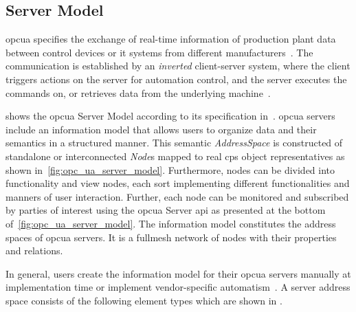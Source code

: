 \documentclass[
a4paper,
twoside,
headsepline,
cleardoublepage=empty,
parskip=half,
draft=false
]{scrbook}
\begin{document}
			\subsection{Server Model}\label{subsec:opc_ua_server_model}

				\gls{opcua} specifies the exchange of real-time information of production plant data between control devices or \gls{it} systems from different manufacturers~\cite{venkatesh2005validating}.
				The communication is established by an \textit{inverted} client-server system, where the client triggers actions on the server for automation control, and the server executes the commands on, or retrieves data from the underlying machine~\cite{imtiaz2013scalability}.
				
				 shows the \gls{opcua} Server Model according to its specification in~\cite{opcfoundation2017part1}.
				\gls{opcua} servers include an information model that allows users to organize data and their semantics in a structured manner.
				This semantic \textit{AddressSpace} is constructed of standalone or interconnected \textit{Node}s mapped to real \gls{cps} object representatives as shown in~\cref{fig:opc_ua_server_model}.
				Furthermore, nodes can be divided into functionality and view nodes, each sort implementing different functionalities and manners of user interaction. Further, each node can be monitored and subscribed by parties of interest using the \gls{opcua} Server \gls{api} as presented at the bottom of~\cref{fig:opc_ua_server_model}.
				The information model constitutes the address spaces of \gls{opcua} servers.
				It is a fullmesh network of nodes with their properties and relations.
				
				In general, users create the information model for their \gls{opcua} servers manually at implementation time or implement vendor-specific automatism~\cite{henssen2014online}.
				A server address space consists of the following element types which are shown in .
\end{document}

